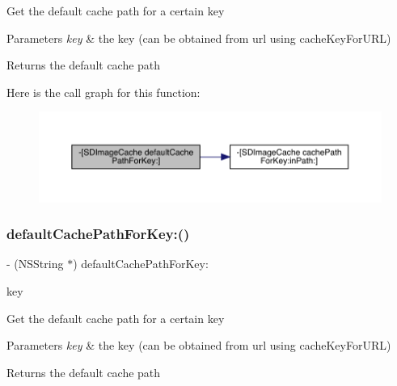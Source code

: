 Get the default cache path for a certain key


\begin{DoxyParams}{Parameters}
{\em key} & the key (can be obtained from url using cache\+Key\+For\+U\+RL)\\
\hline
\end{DoxyParams}
\begin{DoxyReturn}{Returns}
the default cache path 
\end{DoxyReturn}
Here is the call graph for this function\+:\nopagebreak
\begin{figure}[H]
\begin{center}
\leavevmode
\includegraphics[width=350pt]{interface_s_d_image_cache_a591ff2cb8bcd813969b33c610c569bdc_cgraph}
\end{center}
\end{figure}
\mbox{\label{interface_s_d_image_cache_a591ff2cb8bcd813969b33c610c569bdc}} 
\subsubsection{\texorpdfstring{default\+Cache\+Path\+For\+Key\+:()}{defaultCachePathForKey:()}\hspace{0.1cm}{\footnotesize\ttfamily [3/3]}}
{\footnotesize\ttfamily -\/ (N\+S\+String $\ast$) default\+Cache\+Path\+For\+Key\+: \begin{DoxyParamCaption}\item[{(N\+S\+String $\ast$)}]{key }\end{DoxyParamCaption}}

Get the default cache path for a certain key


\begin{DoxyParams}{Parameters}
{\em key} & the key (can be obtained from url using cache\+Key\+For\+U\+RL)\\
\hline
\end{DoxyParams}
\begin{DoxyReturn}{Returns}
the default cache path 
\end{DoxyReturn}
\mbox{\label{interface_s_d_image_cache_a67feea7b5568f427dfcf4f380abc1ba7}} 
